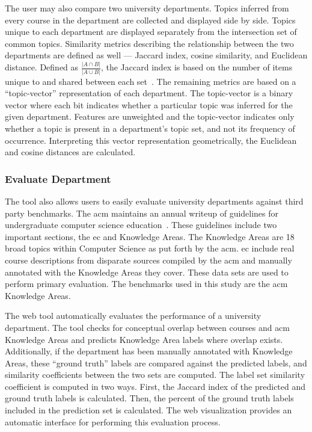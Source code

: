 The user may also compare two university departments.
Topics inferred from every course in the department are collected and displayed side by side.
Topics unique to each department are displayed separately from the intersection set of common topics.
Similarity metrics describing the relationship between the two departments are defined as well --- Jaccard index, cosine similarity, and Euclidean distance.
Defined as $\frac{\left| A \cap B\right|}{\left| A \cup B\right|}$, the Jaccard index is based on the number of items unique to and shared between each set~\cite{jaccard1912}.
The remaining metrics are based on a ``topic-vector'' representation of each department.
The topic-vector is a binary vector where each bit indicates whether a particular topic was inferred for the given department.
Features are unweighted and the topic-vector indicates only whether a topic is present in a department's topic set, and not its frequency of occurrence.
Interpreting this vector representation geometrically, the Euclidean and cosine distances are calculated.


\subsubsection{Evaluate Department}
\label{sec:vis-evaluate}


The tool also allows users to easily evaluate university departments against third party benchmarks.
The \ac{acm} maintains an annual writeup of guidelines for undergraduate computer science education~\cite{CS2013}.
These guidelines include two important sections, the \acf{ec} and Knowledge Areas.
The Knowledge Areas are 18 broad topics within Computer Science as put forth by the \ac{acm}.
\ac{ec} include real course descriptions from disparate sources compiled by the \ac{acm} and manually annotated with the Knowledge Areas they cover.
These data sets are used to perform primary evaluation.
The benchmarks used in this study are the \ac{acm} Knowledge Areas.


The web tool automatically evaluates the performance of a university department.
The tool checks for conceptual overlap between courses and \ac{acm} Knowledge Areas and predicts Knowledge Area labels where overlap exists.
Additionally, if the department has been manually annotated with Knowledge Areas, these ``ground truth'' labels are compared against the predicted labels, and similarity coefficients between the two sets are computed.
The label set similarity coefficient is computed in two ways.
First, the Jaccard index of the predicted and ground truth labels is calculated.
Then, the percent of the ground truth labels included in the prediction set is calculated.
The web visualization provides an automatic interface for performing this evaluation process.

